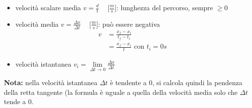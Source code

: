 \documentclass[../main.tex]{subfiles}
\begin{document}
\begin{itemize}
    \item velocità scalare media $v=\frac{d}{t} \phantom{-} \lbrack \frac{m}{s}\rbrack$: lunghezza del percorso, sempre $\geq 0$
    \item velocità media $v=\frac{\Delta x}{\Delta t} \phantom{-}\lbrack \frac{m}{s}\rbrack$: può essere negativa \begin{align*}
        v&=\frac{x_f-x_i}{t_f-t_i} \\
        &=\frac{x_f-x_i}{t} \text{ con } t_i=0s
    \end{align*}
    \item velocità istantanea $v_i=\lim\limits_{\Delta t \to 0}\frac{\Delta x}{\Delta t}$
\end{itemize}
\textbf{Nota:} nella velocità istantanea $\Delta t$ è tendente a 0, si calcola quindi la pendenza della retta tangente (la formula è uguale a quella della velocità media solo che $\Delta t$ tende a $0$.
\end{document}
